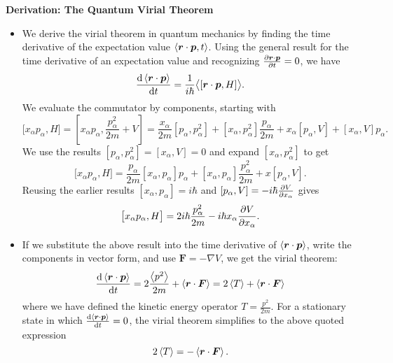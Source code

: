 \documentclass[11pt, a4paper]{article}
\renewcommand{\grad}{\nabla}
\renewcommand{\vec}[1]{\bm{#1}}  %
\renewcommand{\r}{\vec{r}}  %
\newcommand{\evb}[1]{\big \langle {#1} \big \rangle}  %
\begin{document}
\textbf{Derivation: The Quantum Virial Theorem}
\begin{itemize}
	\item We derive the virial theorem in quantum mechanics by finding the time derivative of the expectation value $ \ev{\r \cdot \vec{p}, t} $. Using the general result for the time derivative of an expectation value and recognizing $ \pdv{\r \cdot \vec{p}}{t} = 0 $, we have
	\begin{equation*}
		\dv{\ev{\r \cdot \vec{p}}}{t} = \frac{1}{i \hbar} \evb{[\r \cdot \vec{p}, H]}.
	\end{equation*}
    We evaluate the commutator by components, starting with
 	\begin{equation*}
 		\big[ x_{\alpha} p_{\alpha}, H\big] = \left[x_{\alpha}p_{\alpha}, \frac{p_{\alpha}^{2}}{2m} + V\right] = \frac{x_{\alpha}}{2m} [p_{\alpha}, p_{\alpha}^{2}] + [x_{\alpha}, p_{\alpha}^{2}]\frac{p_{\alpha}}{2m} + x_{\alpha}[p_{\alpha}, V] + [x_{\alpha}, V]p_{\alpha}.
 	\end{equation*}
 	We use the results $ [p_{\alpha}, p_{\alpha}^{2}] = [x_{\alpha}, V] = 0 $ and expand $ [x_{\alpha}, p_{\alpha}^{2}] $ to get
 	\begin{equation*}
 		\big[ x_{\alpha} p_{\alpha}, H\big] = \frac{p_{\alpha}}{2m}[x_{\alpha}, p_{\alpha}]p_{\alpha} + [x_{\alpha}, p_{\alpha}]\frac{p_{\alpha}^{2}}{2m} + x[p_{\alpha}, V].
 	\end{equation*}
 	Reusing the earlier results $ [x_{\alpha}, p_{\alpha}] = i \hbar $ and $ [p_{\alpha}, V] = - i \hbar \pdv{V}{x_{\alpha}} $ gives
 	\begin{equation*}
 		\big[ x_{\alpha} p_{\alpha}, H\big] = 2i \hbar \frac{p_{\alpha}^{2}}{2m} - i \hbar x_{\alpha} \pdv{V}{x_{\alpha}}.
 	\end{equation*}
 	
 	\item If we substitute the above result into the time derivative of $ \ev{\r \cdot \vec{p}} $, write the components in vector form, and use $ \vec{F} = - \grad V $, we get the virial theorem:
 	\begin{equation*}
 		\dv{\ev{\r \cdot \vec{p}}}{t} = 2\frac{\ev{p^{2}}}{2m} + \ev{\r \cdot \vec{F}} = 2 \ev{T} + \ev{\r \cdot \vec{F}}
 	\end{equation*}
 	where we have defined the kinetic energy operator $ T = \frac{p^{2}}{2m} $. For a stationary state in which $ \dv{\ev{\r \cdot \vec{p}}}{t} = 0 $, the virial theorem simplifies to the above quoted expression
 	\begin{equation*}
 		2\ev{T} = - \ev{\r \cdot \vec{F}}.
 	\end{equation*}

\end{itemize}
\end{document}
